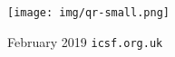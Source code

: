 \vspace*{\fill}
\begin{center}
  \texttt{[image: img/qr-small.png]} \par
  February 2019 \textemdash{} \texttt{icsf.org.uk}
\end{center}
\vspace*{4\baselineskip}
